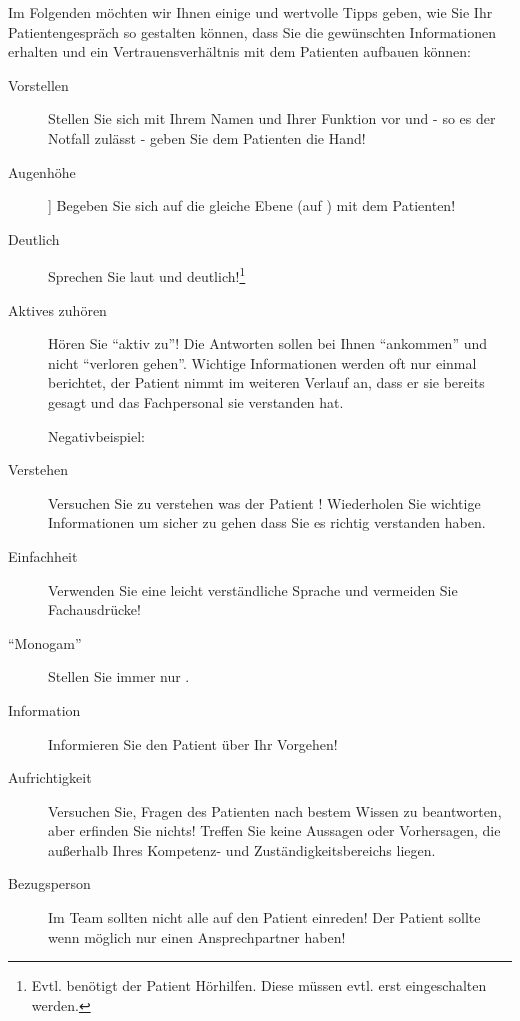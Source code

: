 Im Folgenden möchten wir Ihnen einige  und wertvolle Tipps
geben, wie Sie Ihr Patientengespräch so gestalten können, dass Sie die
gewünschten Informationen erhalten und ein Vertrauensverhältnis mit dem
Patienten aufbauen können:

\begin{description}
    \item[Vorstellen] Stellen Sie sich mit Ihrem Namen und Ihrer Funktion vor
    und - so es der Notfall zulässt - geben Sie dem Patienten die Hand!
    \item[Augenhöhe]] Begeben Sie sich auf die gleiche Ebene (auf )
    mit dem Patienten!
    \item[Deutlich] Sprechen Sie laut und deutlich!\footnote{Evtl. benötigt der
    Patient Hörhilfen. Diese müssen evtl. erst eingeschalten werden.}
    \item[Aktives zuhören] Hören Sie "`aktiv zu"'! Die Antworten sollen bei
    Ihnen "`ankommen"' und nicht "`verloren gehen"'. Wichtige Informationen werden oft nur einmal
    berichtet, der Patient nimmt im weiteren Verlauf an, dass er sie bereits
    gesagt und das Fachpersonal sie verstanden hat.
    
    Negativbeispiel: 
    \item[Verstehen] Versuchen Sie zu verstehen was
    der Patient ! Wiederholen Sie wichtige Informationen um sicher zu
    gehen dass Sie es richtig verstanden haben.
    \item[Einfachheit] Verwenden Sie eine leicht verständliche Sprache und
    vermeiden Sie Fachausdrücke!
    \item["`Monogam"'] Stellen Sie immer nur .
    \item[Information] Informieren Sie den Patient über Ihr Vorgehen!
    \item[Aufrichtigkeit] Versuchen Sie, Fragen des Patienten nach bestem Wissen
    zu beantworten, aber erfinden Sie nichts!  Treffen Sie keine Aussagen oder Vorhersagen, die außerhalb
    Ihres Kompetenz- und Zuständigkeitsbereichs liegen.
    \item[Bezugsperson] Im Team sollten nicht alle auf den Patient einreden! Der
    Patient sollte wenn möglich nur einen Ansprechpartner
    haben!\label{topic:einer-redet}
\end{description}

